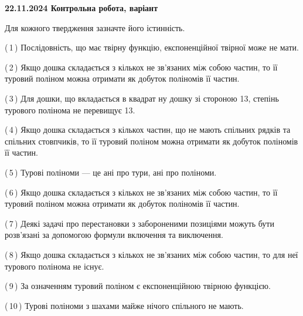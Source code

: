 \documentclass[12pt, ukrainian]{article}
\begin{document}
\begin {large}
\begin {large}
\begin {large}
\begin {large}
\begin {large}
\begin {large}
\begin {large}
\begin {large}
\begin {large}
\begin {large}
\begin {large}
\begin {large}
\begin {large}
\begin {large}
\begin {large}
\begin {large}
{\vspace{5mm}
}
\newpage

\begin {large}

\textbf{22.11.2024 Контрольна робота, варіант  }\par


{
Для кожного твердження зазначте його істинність.\par

\vspace{2mm}

(\,1\,) Послідовність, що має твірну функцію, експоненційної твірної може не мати.%



(\,2\,) Якщо дошка складається з кількох не зв’язаних між собою частин, то її туровий поліном можна отримати як добуток поліномів її частин.%



(\,3\,) Для дошки, що вкладається в квадрат ну дошку зі стороною 13, степінь турового полінома не перевищує 13.%



(\,4\,) Якщо дошка складається з кількох частин, що не мають спільних рядків та спільних стовпчиків, то її туровий поліном можна отримати як добуток поліномів її частин.%



(\,5\,) Турові поліноми --- це ані про тури, ані про поліноми.%



(\,6\,) Якщо дошка складається з кількох не зв’язаних між собою частин, то її туровий поліном можна отримати як добуток поліномів її частин.%



(\,7\,) Деякі задачі про перестановки з забороненими позиціями можуть бути розв’я\-за\-ні за допомогою формули включення та виключення.%



(\,8\,) Якщо дошка складається з кількох не зв’язаних між собою частин, то для неї турового полінома не існує.%



(\,9\,) За означенням туровий поліном є експоненційною твірною функцією.%



(\,10\,) Турові поліноми з шахами майже нічого спільного не мають.%




\vspace{5mm}
}
\newpage


\end{large}
\end{large}
\end{large}
\end{large}
\end{large}
\end{large}
\end{large}
\end{large}
\end{large}
\end{large}
\end{large}
\end{large}
\end{large}
\end{large}
\end{large}
\end{large}
\end{large}
\end{document}
